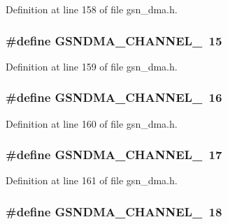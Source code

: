 Definition at line 158 of file gsn\_\-dma.h.

\hypertarget{a00484_a149bbd1fd7faa66916ec0b2a26bdbfc5}{
\subsubsection[{GSNDMA\_\-CHANNEL\_\-15}]{\setlength{\rightskip}{0pt plus 5cm}\#define GSNDMA\_\-CHANNEL\_~15}}
\label{a00484_a149bbd1fd7faa66916ec0b2a26bdbfc5}


Definition at line 159 of file gsn\_\-dma.h.

\hypertarget{a00484_ac41ac8d6de662c1ef0301da9dbcd6bca}{
\subsubsection[{GSNDMA\_\-CHANNEL\_\-16}]{\setlength{\rightskip}{0pt plus 5cm}\#define GSNDMA\_\-CHANNEL\_~16}}
\label{a00484_ac41ac8d6de662c1ef0301da9dbcd6bca}


Definition at line 160 of file gsn\_\-dma.h.

\hypertarget{a00484_adc1496eca719c822510a6bdee111230c}{
\subsubsection[{GSNDMA\_\-CHANNEL\_\-17}]{\setlength{\rightskip}{0pt plus 5cm}\#define GSNDMA\_\-CHANNEL\_~17}}
\label{a00484_adc1496eca719c822510a6bdee111230c}


Definition at line 161 of file gsn\_\-dma.h.

\hypertarget{a00484_a86871f85d077136b43ce24da7401fb46}{
\subsubsection[{GSNDMA\_\-CHANNEL\_\-18}]{\setlength{\rightskip}{0pt plus 5cm}\#define GSNDMA\_\-CHANNEL\_~18}}
\label{a00484_a86871f85d077136b43ce24da7401fb46}



